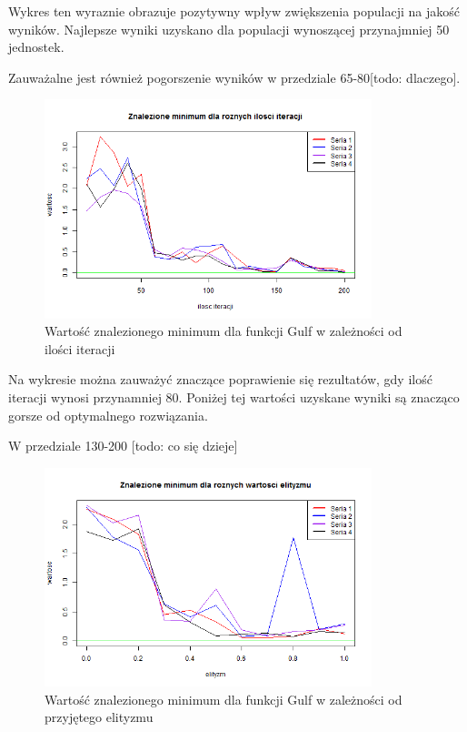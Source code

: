 \documentclass[11pt, a4paper]{article}
\newcommand{\fbi}{\leavevmode{\parindent=1em\indent}}
\begin{document}
\fbi
Wykres ten wyraznie obrazuje pozytywny wpływ zwiększenia populacji na jakość wyników. Najlepsze wyniki uzyskano dla populacji wynoszącej przynajmniej 50 jednostek.

\fbi
Zauważalne jest również pogorszenie wyników w przedziale 65-80[todo: dlaczego].

\begin{figure}[H]
	\begin{center}
		\includegraphics[width=0.85\textwidth]{./assets/Gulf5.png} 
		\caption{Wartość znalezionego minimum dla funkcji Gulf w zależności od ilości iteracji}
		\label{fig:gulf5}
	\end{center}
\end{figure}

\fbi
Na wykresie można zauważyć znaczące poprawienie się rezultatów, gdy ilość iteracji wynosi przynamniej 80. Poniżej tej wartości uzyskane wyniki są znacząco gorsze od optymalnego rozwiązania. 

\fbi
W przedziale 130-200 [todo: co się dzieje]


\begin{figure}[H]
	\begin{center}
		\includegraphics[width=0.85\textwidth]{./assets/Gulf6.png}
		\caption{Wartość znalezionego minimum dla funkcji Gulf w zależności od przyjętego elityzmu}
		\label{fig:gulf6}
	\end{center}
\end{figure}
\end{document}
